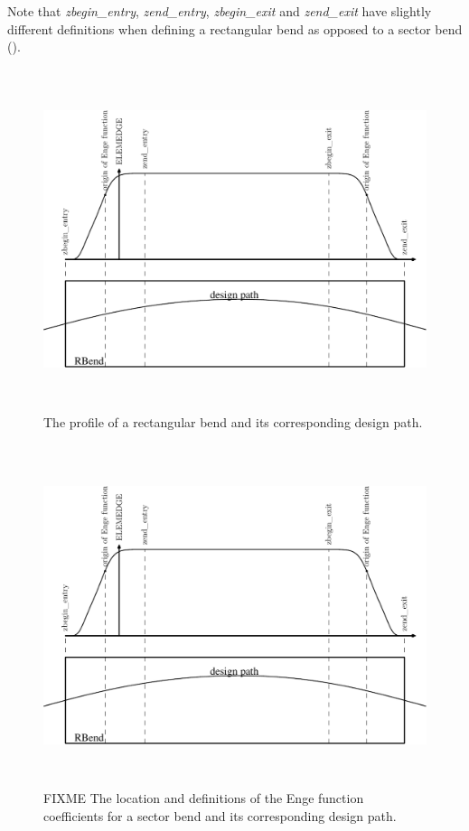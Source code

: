 Note that {\sl zbegin\_entry}, {\sl zend\_entry}, {\sl zbegin\_exit} and {\sl zend\_exit} have slightly different definitions when defining a rectangular bend as opposed to a sector bend ().



\begin{figure}[ht]
  \begin{center}
    \includegraphics[origin=bl,height=100mm,angle=0]{./figures/Fieldmaps/profile-1.pdf}
    \caption{The profile of a rectangular bend and its corresponding design path.}
    \label{fig:fringefields}
  \end{center}
\end{figure}

\begin{figure}[ht]
  \begin{center}
   \includegraphics[origin=bl,height=100mm,angle=0]{./figures/Fieldmaps/profile-1.pdf}
    \caption{FIXME The location and definitions of the Enge function coefficients for a sector bend
      and its corresponding design path.}
    \label{fig:fringefields-sbend}
  \end{center}
\end{figure}

